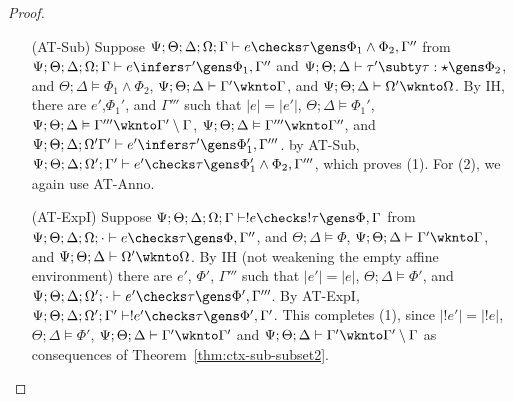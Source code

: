 \begin{proof}
\begin{itemize}
  \item[(AT-Sub)] Suppose 
    $\Psi ; \Theta ; \Delta ; \Omega ; \Gamma \vdash e \checks \tau \gens \Phi_1 \wedge \Phi_2,\Gamma''$ from
   $\Psi ; \Theta ; \Delta ; \Omega ; \Gamma \vdash e \infers \tau' \gens \Phi_1,\Gamma''$ and 
   $\Psi;\Theta;\Delta \vdash \tau' \subty \tau : \star \gens \Phi_2$, and
   $\Theta ; \Delta \vDash \Phi_1 \wedge \Phi_2$,
   $\Psi ; \Theta ; \Delta \vdash \Gamma' \wknto \Gamma$, and
   $\Psi ; \Theta ; \Delta \vdash \Omega' \wknto \Omega$.
   By IH, there are $e'$,$\Phi_1'$, and $\Gamma'''$ such that
   $|e| = |e'|$,
   $\Theta ; \Delta \vDash \Phi_1'$,
   $\Psi ; \Theta ; \Delta \vDash \Gamma''' \wknto \Gamma' \setminus \Gamma$,
   $\Psi ; \Theta ; \Delta \vDash \Gamma''' \wknto \Gamma''$,
   and $\Psi ; \Theta ; \Delta ; \Omega' \Gamma' \vdash e' \infers \tau' \gens \Phi_1',\Gamma'''$.
   by AT-Sub, $\Psi ; \Theta ; \Delta ; \Omega' ; \Gamma' \vdash e' \checks \tau \gens \Phi_1' \wedge \Phi_2,\Gamma'''$, which proves (1).
   For (2), we again use AT-Anno.
   
  \item[(AT-ExpI)] Suppose $\Psi ; \Theta ; \Delta ; \Omega ; \Gamma \vdash !e \checks !\tau \gens \Phi, \Gamma$ from
  $\Psi ; \Theta ; \Delta ; \Omega ; \cdot \vdash e \checks \tau \gens \Phi, \Gamma''$, and
  $\Theta ; \Delta \vDash \Phi$,
  $\Psi ; \Theta ; \Delta \vdash \Gamma' \wknto \Gamma$, and
  $\Psi ; \Theta ; \Delta \vdash \Omega' \wknto \Omega$.
  By IH (not weakening the empty affine environment) there are $e'$, $\Phi'$, $\Gamma'''$ such that 
  $|e'| = |e|$,
  $\Theta ; \Delta \vDash \Phi'$,
  and  $\Psi ; \Theta ; \Delta ; \Omega' ; \cdot \vdash e' \checks \tau \gens \Phi',\Gamma'''$.
  By AT-ExpI,
  $\Psi ; \Theta ; \Delta ; \Omega' ; \Gamma' \vdash !e' \checks \tau \gens \Phi',\Gamma'$.
  This completes (1), since $|!e'| = |!e|$, $\Theta ; \Delta \vDash \Phi'$,
  $\Psi ; \Theta ; \Delta \vdash \Gamma' \wknto \Gamma'$ and $\Psi ; \Theta ; \Delta \vdash \Gamma' \wknto \Gamma' \setminus \Gamma$
  as consequences of Theorem~\ref{thm:ctx-sub-subset2}.
  

\end{itemize}
\end{proof}
